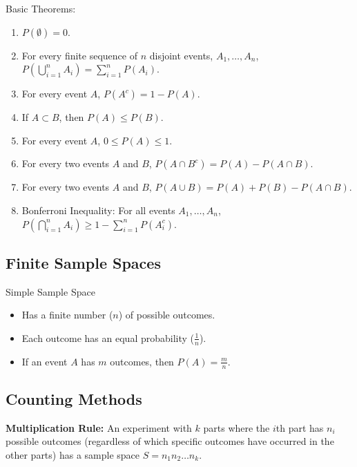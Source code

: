\documentclass[11pt]{article}
\begin{document}
Basic Theorems:
\begin{enumerate}
    \item $P(\emptyset) = 0$.
    \item For every finite sequence of $n$ disjoint events, $A_1, \ldots, A_n$, $P( 
    \bigcup_{i=1}^{n} A_i) = \sum_{i=1}^{n}P(A_i)$.
    \item For every event $A$, $P(A^c) = 1 - P(A)$.
    \item If $A \subset B$, then $P(A) \le P(B)$.
    \item For every event $A$, $0 \le P(A) \le 1$.
    \item For every two events $A$ and $B$, $P(A \cap B^c) = P(A) - P(A \cap B)$.
    \item For every two events $A$ and $B$, $P(A \cup B) = P(A) + P(B) - P(A \cap B)$.
    \item Bonferroni Inequality: For all events $A_1, \ldots, A_n$, $P(\bigcap_{i=1}^{n} A_i) 
    \ge 1 - \sum_{i=1}^{n} P(A_i^c)$.
\end{enumerate}

\subsection{Finite Sample Spaces}

Simple Sample Space
\begin{itemize}
    \item Has a finite number ($n$) of possible outcomes.
    \item Each outcome has an equal probability ($\frac{1}{n}$).
    \item If an event $A$ has $m$ outcomes, then $P(A) = \frac{m}{n}$.
\end{itemize}

\subsection{Counting Methods}

\textbf{Multiplication Rule:} An experiment with $k$ parts where the $i$th part has $n_i$ 
possible outcomes (regardless of which specific outcomes have occurred in the other parts) has 
a sample space $S = n_1 n_2 \ldots n_k$. \\
\end{document}
